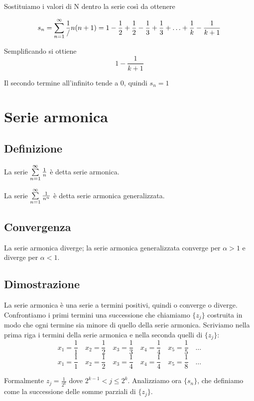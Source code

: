 Sostituiamo i valori di N dentro la serie così da ottenere

$$s_{n} = \sum\limits_{n=1}^{\infty}\frac{1}/{n(n+1)} = 1 - \frac{1}{2} + \frac{1}{2} - \frac{1}{3} + \frac{1}{3} + \ldots + \frac{1}{k} - \frac{1}{k+1}$$

Semplificando si ottiene $$1-\frac{1}{k+1}$$

Il secondo termine all'infinito tende a 0, quindi $s_{n} = 1$

\section{Serie armonica}

\subsection{Definizione}
La serie $\sum\limits_{n=1}^{\infty}\frac{1}{n}$ è detta serie armonica.

La serie $\sum\limits_{n=1}^{\infty}\frac{1}{n^\alpha}$ è detta serie armonica generalizzata.

\subsection{Convergenza}
La serie armonica diverge; la serie armonica generalizzata converge per $\alpha > 1$ e diverge per $\alpha < 1$.

\subsection{Dimostrazione}
La serie armonica è una serie a termini positivi, quindi o converge o diverge. Confrontiamo i primi termini una successione che chiamiamo $\{z_j\}$ costruita in modo che ogni termine sia minore di quello della serie armonica. Scriviamo nella prima riga i termini della serie armonica e nella seconda quelli di $\{z_j\}$:
\begin{equation*}
x_1 = \frac{1}{1} \quad x_2 = \frac{1}{2} \quad x_3 = \frac{1}{3} \quad x_4 = \frac{1}{4} \quad x_5 = \frac{1}{5} \quad \ldots 
\end{equation*}
\begin{equation*}
x_1 = \frac{1}{1} \quad x_2 = \frac{1}{2} \quad x_3 = \frac{1}{4} \quad x_4 = \frac{1}{4} \quad x_5 = \frac{1}{8} \quad \ldots 
\end{equation*}

Formalmente $z_j = \frac{1}{2^k}$ dove $2^{k-1} < j \le 2^k$. Analizziamo ora $\{s_n\}$, che definiamo come la successione delle somme parziali di $\{z_j\}$.

